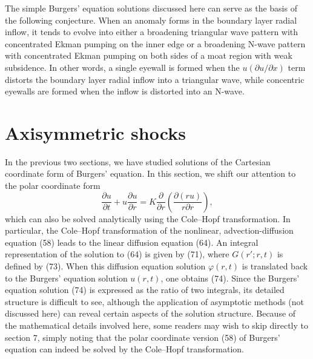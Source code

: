 \documentclass[10pt]{article}
\begin{document}
     The simple Burgers' equation solutions discussed here can serve as the
basis of the following conjecture. When an anomaly forms in the boundary layer
radial inflow, it tends to evolve into either a broadening triangular wave pattern
with concentrated Ekman pumping on the inner edge or a broadening N-wave pattern
with concentrated Ekman pumping on both sides of a moat region with weak subsidence.
In other words, a single eyewall is formed when the $u(\partial u/\partial x)$ term
distorts the boundary layer radial inflow into a triangular wave, while
concentric eyewalls are formed when the inflow is distorted into an N-wave.


\section{Axisymmetric shocks}           %

     In the previous two sections, we have studied solutions of the Cartesian
coordinate form of Burgers' equation.  In this section, we shift our attention
to the polar coordinate form
\begin{equation}                                 %
        \frac{\partial u}{\partial t}
     + u\frac{\partial u}{\partial r}
     = K\frac{\partial}{\partial r}\left(\frac{\partial(ru)}{r\partial r}\right),
\label{eq6.1}
\end{equation}
which can also be solved analytically using the Cole--Hopf transformation.
In particular, the Cole--Hopf transformation of the nonlinear, advection-diffusion
equation (58) leads to the linear diffusion equation (64). An integral
representation of the solution to (64) is given by (71), where $G(r';r,t)$ is
defined by (73). When this diffusion equation solution $\varphi(r,t)$ is translated
back to the Burgers' equation solution $u(r,t)$, one obtains (74). Since the
Burgers' equation solution (74) is expressed as the ratio of two integrals,
its detailed structure is difficult to see, although the application of asymptotic
methods (not discussed here) can reveal certain aspects of the solution structure.
Because of the mathematical details involved here, some readers may wish to skip
directly to section 7, simply noting that the polar coordinate version (58)
of Burgers' equation can indeed be solved by the Cole--Hopf transformation.
\end{document}
